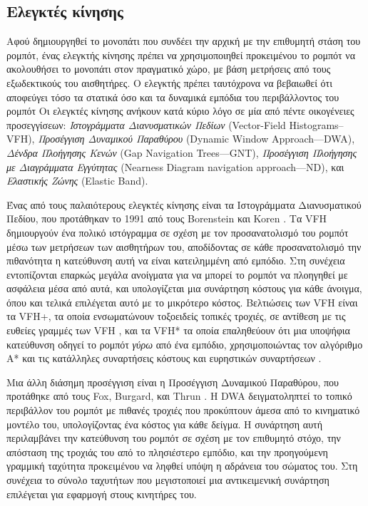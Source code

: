 \subsection{Ελεγκτές κίνησης}
\label{subsection:02_01_02:02}

Αφού δημιουργηθεί το μονοπάτι που συνδέει την αρχική με την επιθυμητή στάση του
ρομπότ, ένας ελεγκτής κίνησης πρέπει να χρησιμοποιηθεί προκειμένου το ρομπότ να
ακολουθήσει το μονοπάτι στον πραγματικό χώρο, με βάση μετρήσεις από τους
εξωδεκτικούς του αισθητήρες. Ο ελεγκτής πρέπει ταυτόχρονα να βεβαιωθεί ότι
αποφεύγει τόσο τα στατικά όσο και τα δυναμικά εμπόδια του περιβάλλοντος του
ρομπότ Οι ελεγκτές κίνησης ανήκουν κατά κύριο λόγο σε μία από πέντε οικογένειες
προσεγγίσεων: \textit{Ιστογράμματα Διανυσματικών Πεδίων} (Vector-Field
Histograms--VFH), \textit{Προσέγγιση Δυναμικού Παραθύρου} (Dynamic Window
Approach---DWA), \textit{Δένδρα Πλοήγησης Κενών} (Gap Navigation Trees---GNT),
\textit{Προσέγγιση Πλοήγησης με Διαγράμματα Εγγύτητας} (Nearness Diagram
navigation approach---ND), και \textit{Ελαστικής Ζώνης} (Elastic Band).

Ένας από τους παλαιότερους ελεγκτές κίνησης είναι τα Ιστογράμματα Διανυσματικού
Πεδίου, που προτάθηκαν το 1991 από τους Borenstein και Koren
\cite{Borenstein1991}. Τα VFH δημιουργούν ένα πολικό ιστόγραμμα σε σχέση με τον
προσανατολισμό του ρομπότ μέσω των μετρήσεων των αισθητήρων του, αποδίδοντας σε
κάθε προσανατολισμό την πιθανότητα η κατεύθυνση αυτή να είναι κατειλημμένη από
εμπόδιο. Στη συνέχεια εντοπίζονται επαρκώς μεγάλα ανοίγματα για να μπορεί το
ρομπότ να πλοηγηθεί με ασφάλεια μέσα από αυτά, και υπολογίζεται μια συνάρτηση
κόστους για κάθε άνοιγμα, όπου και τελικά επιλέγεται αυτό με το μικρότερο
κόστος.  Βελτιώσεις των VFH είναι τα VFH+, τα οποία ενσωματώνουν τοξοειδείς
τοπικές τροχιές, σε αντίθεση με τις ευθείες γραμμές των VFH \cite{Ulrich}, και
τα VFH* τα οποία επαληθεύουν ότι μια υποψήφια κατεύθυνση οδηγεί το ρομπότ
\textit{γύρω} από ένα εμπόδιο, χρησιμοποιώντας τον αλγόριθμο A* και τις
κατάλληλες συναρτήσεις κόστους και ευρηστικών συναρτήσεων \cite{Ulricha}.

Μια άλλη διάσημη προσέγγιση είναι η Προσέγγιση Δυναμικού Παραθύρου, που
προτάθηκε από τους Fox, Burgard, και Thrun \cite{Fox1997}. Η DWA δειγματοληπτεί
το τοπικό περιβάλλον του ρομπότ με πιθανές τροχιές που προκύπτουν άμεσα από το
κινηματικό μοντέλο του, υπολογίζοντας ένα κόστος για κάθε δείγμα. Η συνάρτηση
αυτή περιλαμβάνει την κατεύθυνση του ρομπότ σε σχέση με τον επιθυμητό στόχο,
την απόσταση της τροχιάς του από το πλησιέστερο εμπόδιο, και την προηγούμενη
γραμμική ταχύτητα προκειμένου να ληφθεί υπόψη η αδράνεια του σώματος του. Στη
συνέχεια το σύνολο ταχυτήτων που μεγιστοποιεί μια αντικειμενική συνάρτηση
επιλέγεται για εφαρμογή στους κινητήρες του.

